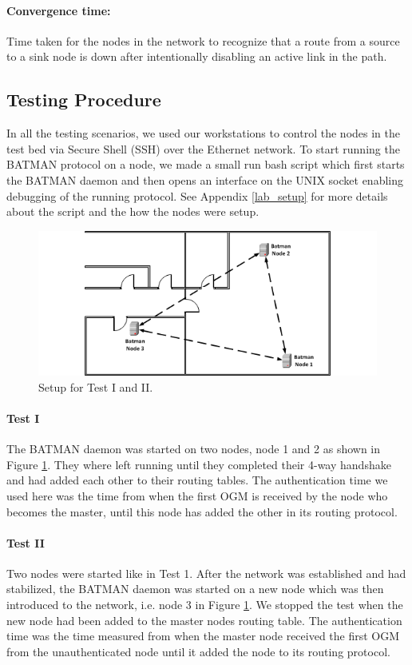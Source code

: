 \paragraph{Convergence time:} Time taken for the nodes in the network to recognize that a route from a source to a sink node is down after intentionally disabling an active link in the path.

\subsection{Testing Procedure}
In all the testing scenarios, we used our workstations to control the nodes in the test bed via Secure Shell (SSH) over the Ethernet network. To start running the BATMAN protocol on a node, we made a small run bash script which first starts the BATMAN daemon and then opens an interface on the UNIX socket enabling debugging of the running protocol. See Appendix \ref{lab_setup} for more details about the script and the how the nodes were setup.
\\

\begin{figure}[ht!]
  \centering
  \includegraphics{images/lab_setup_room_view_test1-2.png}
  \caption{Setup for Test I and II.}
  \label{fig:test_1_2}
\end{figure}

\paragraph{Test I} The BATMAN daemon was started on two nodes, node 1 and 2 as shown in Figure \ref{fig:test_1_2}. They where left running until they completed their 4-way handshake and had added each other to their routing tables. The authentication time we used here was the time from when the first OGM is received by the node who becomes the master, until this node has added the other in its routing protocol.

\paragraph{Test II} Two nodes were started like in Test 1. After the network was established and had stabilized, the BATMAN daemon was started on a new node which was then introduced to the network, i.e. node 3 in Figure \ref{fig:test_1_2}. We stopped the test when the new node had been added to the master nodes routing table. The authentication time was the time measured from when the master node received the first OGM from the unauthenticated node until it added the node to its routing protocol.
\\

